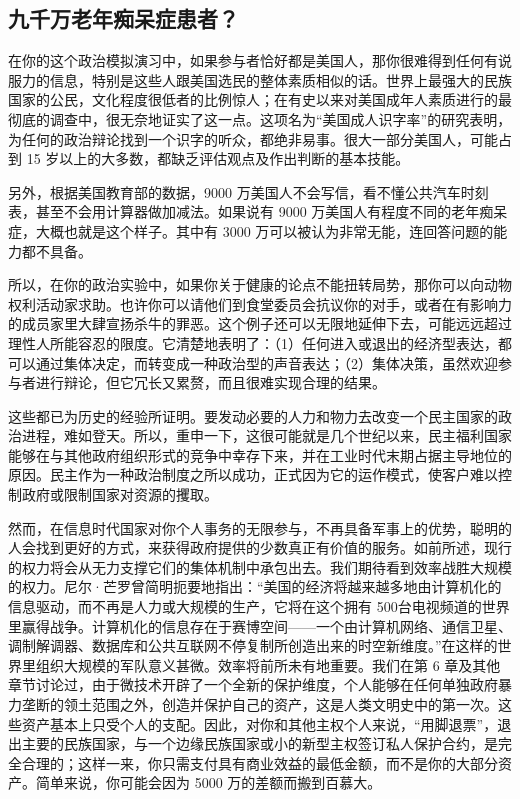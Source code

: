 \subsection{九千万老年痴呆症患者？}
在你的这个政治模拟演习中，如果参与者恰好都是美国人，那你很难得到任何有说服力的信息，特别是这些人跟美国选民的整体素质相似的话。世界上最强大的民族国家的公民，文化程度很低者的比例惊人；在有史以来对美国成年人素质进行的最彻底的调查中，很无奈地证实了这一点。这项名为“美国成人识字率”的研究表明，为任何的政治辩论找到一个识字的听众，都绝非易事。很大一部分美国人，可能占到 15 岁以上的大多数，都缺乏评估观点及作出判断的基本技能。

另外，根据美国教育部的数据，9000 万美国人不会写信，看不懂公共汽车时刻表，甚至不会用计算器做加减法。如果说有 9000 万美国人有程度不同的老年痴呆症，大概也就是这个样子。其中有 3000 万可以被认为非常无能，连回答问题的能力都不具备。

所以，在你的政治实验中，如果你关于健康的论点不能扭转局势，那你可以向动物权利活动家求助。也许你可以请他们到食堂委员会抗议你的对手，或者在有影响力的成员家里大肆宣扬杀牛的罪恶。这个例子还可以无限地延伸下去，可能远远超过理性人所能容忍的限度。它清楚地表明了：（1）任何进入或退出的经济型表达，都可以通过集体决定，而转变成一种政治型的声音表达；（2）集体决策，虽然欢迎参与者进行辩论，但它冗长又累赘，而且很难实现合理的结果。

这些都已为历史的经验所证明。要发动必要的人力和物力去改变一个民主国家的政治进程，难如登天。所以，重申一下，这很可能就是几个世纪以来，民主福利国家能够在与其他政府组织形式的竞争中幸存下来，并在工业时代末期占据主导地位的原因。民主作为一种政治制度之所以成功，正式因为它的运作模式，使客户难以控制政府或限制国家对资源的攫取。

然而，在信息时代国家对你个人事务的无限参与，不再具备军事上的优势，聪明的人会找到更好的方式，来获得政府提供的少数真正有价值的服务。如前所述，现行的权力将会从无力支撑它们的集体机制中承包出去。我们期待看到效率战胜大规模的权力。尼尔·芒罗曾简明扼要地指出：“美国的经济将越来越多地由计算机化的信息驱动，而不再是人力或大规模的生产，它将在这个拥有 500台电视频道的世界里赢得战争。计算机化的信息存在于赛博空间——一个由计算机网络、通信卫星、调制解调器、数据库和公共互联网不停复制所创造出来的时空新维度。”在这样的世界里组织大规模的军队意义甚微。效率将前所未有地重要。我们在第 6 章及其他章节讨论过，由于微技术开辟了一个全新的保护维度，个人能够在任何单独政府暴力垄断的领土范围之外，创造并保护自己的资产，这是人类文明史中的第一次。这些资产基本上只受个人的支配。因此，对你和其他主权个人来说，“用脚退票”，退出主要的民族国家，与一个边缘民族国家或小的新型主权签订私人保护合约，是完全合理的；这样一来，你只需支付具有商业效益的最低金额，而不是你的大部分资产。简单来说，你可能会因为 5000 万的差额而搬到百慕大。

